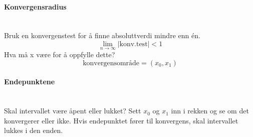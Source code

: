 \paragraph{Konvergensradius} \mbox{} \\
Bruk en konvergenstest for å finne absoluttverdi mindre enn én.
$$\lim_{n \to \infty} |\text{konv.test}| < 1$$
Hva må x være for å oppfylle dette?
$$\text{konvergensområde} = (x_0, x_1)$$



\paragraph{Endepunktene} \mbox{} \\
Skal intervallet være åpent eller lukket?
Sett $x_0$ og $x_1$ inn i rekken og se om det konvergerer eller ikke.
Hvis endepunktet fører til konvergens, skal intervallet lukkes i den enden.
